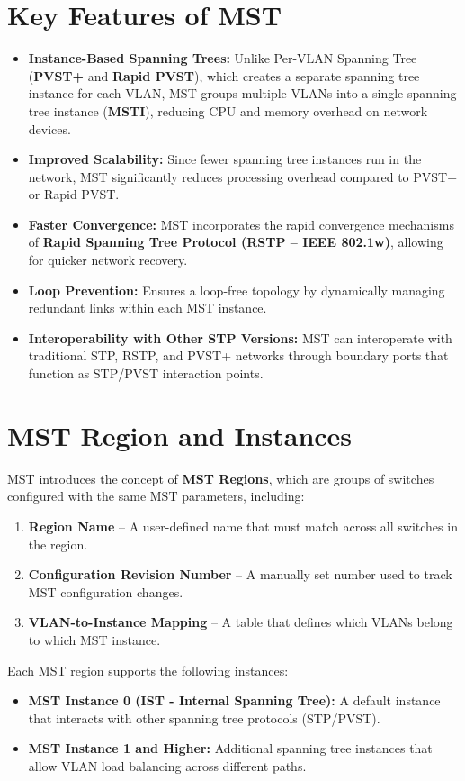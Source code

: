 \documentclass[a4paper]{book}
\begin{document}
\section*{Key Features of MST}
\begin{itemize}
	\item \textbf{Instance-Based Spanning Trees:} Unlike Per-VLAN Spanning Tree (\textbf{PVST+} and \textbf{Rapid PVST}), which creates a separate spanning tree instance for each VLAN, MST groups multiple VLANs into a single spanning tree instance (\textbf{MSTI}), reducing CPU and memory overhead on network devices.
	\item \textbf{Improved Scalability:} Since fewer spanning tree instances run in the network, MST significantly reduces processing overhead compared to PVST+ or Rapid PVST.
	\item \textbf{Faster Convergence:} MST incorporates the rapid convergence mechanisms of \textbf{Rapid Spanning Tree Protocol (RSTP – IEEE 802.1w)}, allowing for quicker network recovery.
	\item \textbf{Loop Prevention:} Ensures a loop-free topology by dynamically managing redundant links within each MST instance.
	\item \textbf{Interoperability with Other STP Versions:} MST can interoperate with traditional STP, RSTP, and PVST+ networks through boundary ports that function as STP/PVST interaction points.
\end{itemize}

\section*{MST Region and Instances}
MST introduces the concept of \textbf{MST Regions}, which are groups of switches configured with the same MST parameters, including:
\begin{enumerate}
	\item \textbf{Region Name} – A user-defined name that must match across all switches in the region.
	\item \textbf{Configuration Revision Number} – A manually set number used to track MST configuration changes.
	\item \textbf{VLAN-to-Instance Mapping} – A table that defines which VLANs belong to which MST instance.
\end{enumerate}

Each MST region supports the following instances:
\begin{itemize}
	\item \textbf{MST Instance 0 (IST - Internal Spanning Tree):} A default instance that interacts with other spanning tree protocols (STP/PVST).
	\item \textbf{MST Instance 1 and Higher:} Additional spanning tree instances that allow VLAN load balancing across different paths.
\end{itemize}
\end{document}
